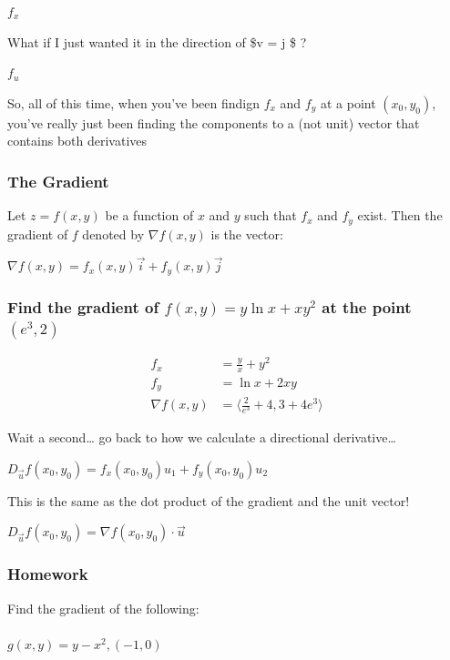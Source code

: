 \documentclass[
  letterpaper,
  DIV=11,
  numbers=noendperiod]{scrartcl}
\let\oldparagraph\paragraph
\renewcommand{\paragraph}[1]{\oldparagraph{#1}\mbox{}}
\begin{document}
\(f_x\)

What if I just wanted it in the direction of \$v = j \$ ?

\(f_u\)

So, all of this time, when you've been findign \(f_x\) and \(f_y\) at a
point \((x_0, y_0)\), you've really just been finding the components to
a (not unit) vector that contains both derivatives

\subsubsection{The Gradient}\label{the-gradient}

Let \(z = f(x, y)\) be a function of \(x\) and \(y\) such that \(f_x\)
and \(f_y\) exist. Then the gradient of \(f\) denoted by
\(\nabla f(x, y)\) is the vector:

\(\nabla f(x, y) = f_x(x, y)\vec{i} + f_y(x, y)\vec{j}\)

\subsubsection{\texorpdfstring{Find the gradient of
\(f(x, y) = y\ln x + xy^2\) at the point
\((e^3, 2)\)}{Find the gradient of f(x, y) = y\textbackslash ln x + xy\^{}2 at the point (e\^{}3, 2)}}\label{find-the-gradient-of-fx-y-yln-x-xy2-at-the-point-e3-2}

\begin{align*}
f_x &= \frac{y}{x} + y^2 \\
f_y &= \ln x + 2xy \\
\nabla f(x, y) &= \langle \frac{2}{e^3} + 4 , 3+4e^3 \rangle
\end{align*}

Wait a second\ldots{} go back to how we calculate a directional
derivative\ldots{}

\(D_{\vec{u}}f(x_0, y_0) = f_x(x_0, y_0)u_1 + f_y(x_0, y_0)u_2\)

This is the same as the dot product of the gradient and the unit vector!

\(D_{\vec{u}}f(x_0, y_0) = \nabla f(x_0, y_0) \cdot \vec{u}\)

\subsubsection{Homework}\label{homework-3}

Find the gradient of the following:

\paragraph{\texorpdfstring{\(g(x, y) = y-x^2, (-1, 0)\)}{g(x, y) = y-x\^{}2, (-1, 0)}}\label{gx-y-y-x2--1-0}
\end{document}
